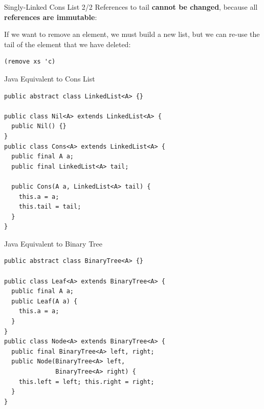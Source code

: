 \documentclass{beamer}
\begin{document}
\begin{frame}[fragile]{Singly-Linked Cons List 2/2}
References to tail \textbf{cannot be changed}, because all \textbf{references are immutable}:

\vspace{.5cm}


\pause{} \vspace{.5cm}

If we want to remove an element, we must build a new list, but we can re-use the tail of the element that we have deleted:

\begin{lstlisting}
(remove xs 'c)
\end{lstlisting}

\pause{}

\end{frame}

\begin{frame}[fragile]{Java Equivalent to Cons List}
\begin{lstlisting}[style=Java]
public abstract class LinkedList<A> {}

public class Nil<A> extends LinkedList<A> {
  public Nil() {}
}
public class Cons<A> extends LinkedList<A> {
  public final A a;
  public final LinkedList<A> tail;

  public Cons(A a, LinkedList<A> tail) {
    this.a = a;
    this.tail = tail;
  }
}
\end{lstlisting}
\end{frame}

\begin{frame}[fragile]{Java Equivalent to Binary Tree}
\begin{lstlisting}[style=Java]
public abstract class BinaryTree<A> {}

public class Leaf<A> extends BinaryTree<A> {
  public final A a;
  public Leaf(A a) {
    this.a = a;
  }
}
public class Node<A> extends BinaryTree<A> {
  public final BinaryTree<A> left, right;
  public Node(BinaryTree<A> left,
              BinaryTree<A> right) {
    this.left = left; this.right = right;
  }
}
\end{lstlisting}
\end{frame}
\end{document}
